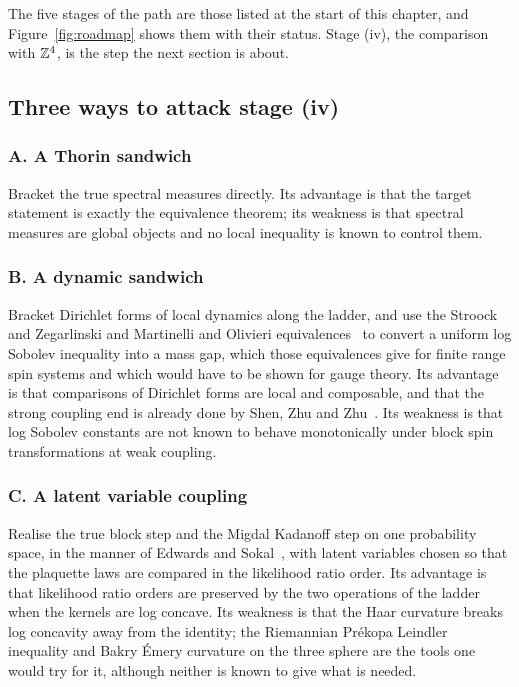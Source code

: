 The five stages of the path are those listed at the start of this chapter, and Figure~\ref{fig:roadmap} shows them with their status. Stage (iv), the comparison with $\mathbb{Z}^4$, is the step the next section is about.

\subsection{Three ways to attack stage (iv)}

\subsubsection*{A. A Thorin sandwich}
Bracket the true spectral measures directly. Its advantage is that the target statement is exactly the equivalence theorem; its weakness is that spectral measures are global objects and no local inequality is known to control them.

\subsubsection*{B. A dynamic sandwich}
Bracket Dirichlet forms of local dynamics along the ladder, and use the Stroock and Zegarlinski and Martinelli and Olivieri equivalences~\cite{SZ92,MO94} to convert a uniform log Sobolev inequality into a mass gap, which those equivalences give for finite range spin systems and which would have to be shown for gauge theory. Its advantage is that comparisons of Dirichlet forms are local and composable, and that the strong coupling end is already done by Shen, Zhu and Zhu~\cite{SZZ}. Its weakness is that log Sobolev constants are not known to behave monotonically under block spin transformations at weak coupling.

\subsubsection*{C. A latent variable coupling}
Realise the true block step and the Migdal Kadanoff step on one probability space, in the manner of Edwards and Sokal~\cite{ES88}, with latent variables chosen so that the plaquette laws are compared in the likelihood ratio order. Its advantage is that likelihood ratio orders are preserved by the two operations of the ladder when the kernels are log concave. Its weakness is that the Haar curvature breaks log concavity away from the identity; the Riemannian Pr\'ekopa Leindler inequality and Bakry \'Emery curvature on the three sphere are the tools one would try for it, although neither is known to give what is needed.


